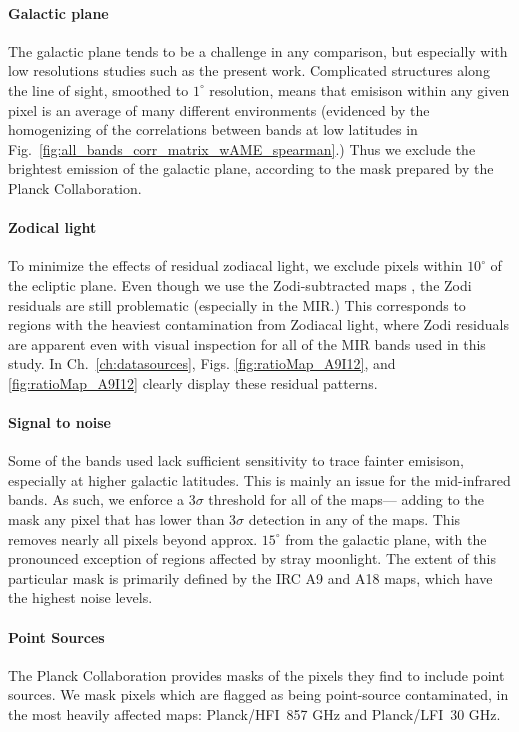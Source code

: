         \paragraph{Galactic plane}
          The galactic plane tends to be a challenge in any comparison, but especially with low resolutions studies such as the present work. Complicated structures along the line of sight, smoothed to $1^{\circ}$ resolution, means that emisison within any given pixel is an average of many different environments (evidenced by the homogenizing of the correlations between bands at low latitudes in Fig.~\ref{fig:all_bands_corr_matrix_wAME_spearman}.) Thus we exclude the brightest emission of the galactic plane, according to the mask prepared by the Planck Collaboration.

        \paragraph{Zodical light}
          To minimize the effects of residual zodiacal light, we exclude pixels within $10^{\circ}$ of the ecliptic plane.  Even though we use the Zodi-subtracted maps \citep{kelsall98, kondo16, ootsubo16}, the Zodi residuals are still problematic (especially in the MIR.) This corresponds to regions with the heaviest contamination from Zodiacal light, where Zodi residuals are apparent even with visual inspection for all of the MIR bands used in this study. In Ch.~\ref{ch:datasources}, Figs. \ref{fig:ratioMap_A9I12}, and \ref{fig:ratioMap_A9I12} clearly display these residual patterns.

        \paragraph{Signal to noise}
          Some of the bands used lack sufficient sensitivity to trace fainter emisison, especially at higher galactic latitudes. This is mainly an issue for the mid-infrared bands. As such, we enforce a 3$\sigma$ threshold for all of the maps--- adding to the mask any pixel that has lower than 3$\sigma$ detection in any of the maps. This removes nearly all pixels beyond approx. $15^{\circ}$ from the galactic plane, with the pronounced exception of regions affected by stray moonlight. The extent of this particular mask is primarily defined by the IRC A9 and A18 maps, which have the highest noise levels.

       \paragraph{Point Sources}
         The Planck Collaboration provides masks of the pixels they find to include point sources. We mask pixels which are flagged as being point-source contaminated, in the most heavily affected maps: Planck/HFI~857 GHz and Planck/LFI~30 GHz.

